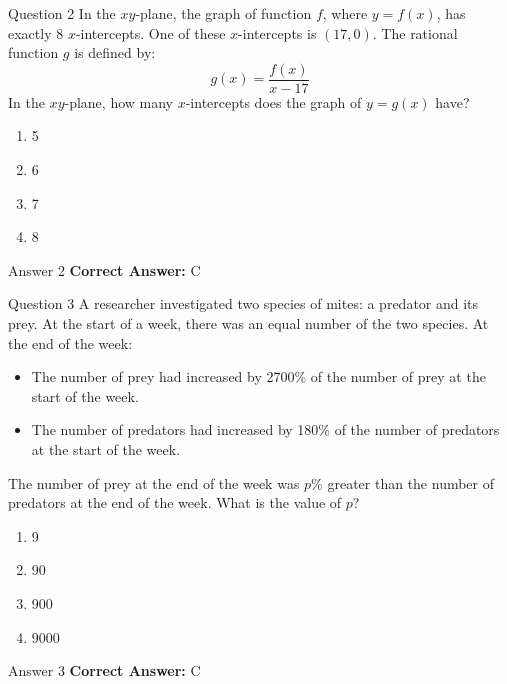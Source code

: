 \documentclass{beamer}
\begin{document}
\begin{frame}{Question 2}
\small
In the \(xy\)-plane, the graph of function \(f\), where \(y = f(x)\), has exactly 8 \(x\)-intercepts.
One of these \(x\)-intercepts is \((17, 0)\).
The rational function \(g\) is defined by:
\[
g(x) = \frac{f(x)}{x - 17}
\]
In the \(xy\)-plane, how many \(x\)-intercepts does the graph of \(y = g(x)\) have?
\vspace{0.35cm}
\begin{enumerate}
    \item[A.] 5
    \item[B.] 6
    \item[C.] 7
    \item[D.] 8
\end{enumerate}
\end{frame}
\begin{frame}{Answer 2}
\small
\textbf{Correct Answer:} C
\end{frame}

\begin{frame}{Question 3}
\small
A researcher investigated two species of mites: a predator and its prey.
At the start of a week, there was an equal number of the two species.
At the end of the week:

\begin{itemize}
\item The number of prey had increased by 2700\% of the number of prey at the start of the week.
\item The number of predators had increased by 180\% of the number of predators at the start of the week.
\end{itemize}

The number of prey at the end of the week was \(p\%\) greater than the number of predators at the end of the week.
What is the value of \(p\)?
\vspace{0.35cm}
\begin{enumerate}
    \item[A.] 9
    \item[B.] 90
    \item[C.] 900
    \item[D.] 9000
\end{enumerate}
\end{frame}
\begin{frame}{Answer 3}
\small
\textbf{Correct Answer:} C
\end{frame}
\end{document}

